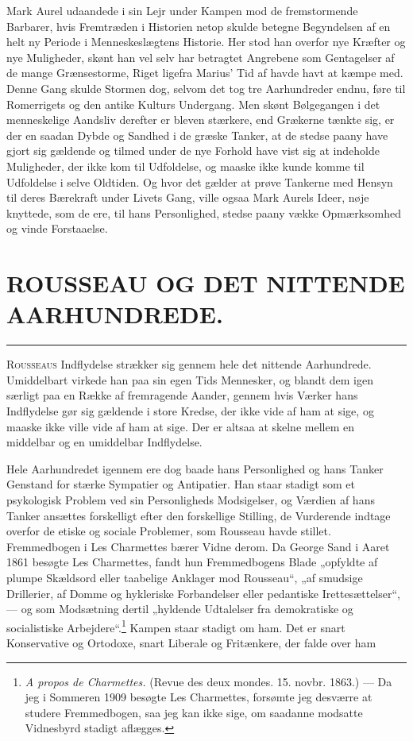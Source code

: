 \documentclass[12pt,a4paper,openany]{book}
\newcommand{\opage}[1]{\marginnote{\footnotesize\textit{[#1]}}}
\newcommand{\essay}[2][]{\chapter*{#2}\addcontentsline{toc}{chapter}{#1}}   %
\newcommand{\streg}{\begin{center}\rule{3em}{0.4pt}\end{center}}
\begin{document}
Mark Aurel udaandede i sin Lejr under Kampen mod de
fremstormende Barbarer, hvis Fremtræden i Historien netop
skulde betegne Begyndelsen af en helt ny Periode i Menneskeslægtens
Historie. Her stod han overfor nye Kræfter og nye
Muligheder, skønt han vel selv har betragtet Angrebene som
Gentagelser af de mange Grænsestorme, Riget ligefra Marius’
Tid af havde havt at kæmpe med. Denne Gang skulde Stormen
dog, selvom det tog tre Aarhundreder endnu, føre til
Romerrigets og den antike Kulturs Undergang. Men skønt
Bølgegangen i det menneskelige Aandsliv derefter er bleven
stærkere, end Grækerne tænkte sig, er der en saadan Dybde
og Sandhed i de græske Tanker, at de stedse paany have gjort
sig gældende og tilmed under de nye Forhold have vist sig at
indeholde Muligheder, der ikke kom til Udfoldelse, og maaske
ikke kunde komme til Udfoldelse i selve Oldtiden. Og hvor
det gælder at prøve Tankerne med Hensyn til deres Bærekraft
under Livets Gang, ville ogsaa Mark Aurels Ideer, nøje knyttede,
som de ere, til hans Personlighed, stedse paany vække
Opmærksomhed og vinde Forstaaelse.

\setcounter{footnote}{0}%
\opage{120}\essay[Rousseau og det nittende Aarhundrede (1912)]{ROUSSEAU OG DET NITTENDE \\ AARHUNDREDE.}
\streg

R\textsc{ousseaus} Indflydelse strækker sig gennem hele det nittende
Aarhundrede. Umiddelbart virkede han paa sin egen Tids
Mennesker, og blandt dem igen særligt paa en Række af
fremragende Aander, gennem hvis Værker hans Indflydelse gør
sig gældende i store Kredse, der ikke vide af ham at sige, og
maaske ikke ville vide af ham at sige. Der er altsaa at skelne
mellem en middelbar og en umiddelbar Indflydelse.

Hele Aarhundredet igennem ere dog baade hans Personlighed
og hans Tanker Genstand for stærke Sympatier og Antipatier.
Han staar stadigt som et psykologisk Problem ved sin Personligheds
Modsigelser, og Værdien af hans Tanker ansættes forskelligt
efter den forskellige Stilling, de Vurderende indtage overfor
de etiske og sociale Problemer, som Rousseau havde stillet.
Fremmedbogen i Les Charmettes bærer Vidne derom. Da George
Sand i Aaret 1861 besøgte Les Charmettes, fandt hun Fremmedbogens
Blade „opfyldte af plumpe Skældsord eller taabelige Anklager
mod Rousseau“, „af smudsige Drillerier, af Domme og
hykleriske Forbandelser eller pedantiske Irettesættelser“, --- og
som Modsætning dertil „hyldende Udtalelser fra demokratiske og
socialistiske Arbejdere“.\footnote[1]{\textit{A propos de Charmettes.} (Revue des deux mondes. 15. novbr. 1863.) --- Da jeg i Sommeren 1909 besøgte Les Charmettes, forsømte jeg desværre at studere Fremmedbogen, saa jeg kan ikke sige, om saadanne modsatte Vidnesbyrd stadigt aflægges.} Kampen staar stadigt om ham. Det
\setcounter{footnote}{0}%
\opage{121}er snart Konservative og Ortodoxe, snart Liberale og Fritænkere,
der falde over ham
\end{document}
